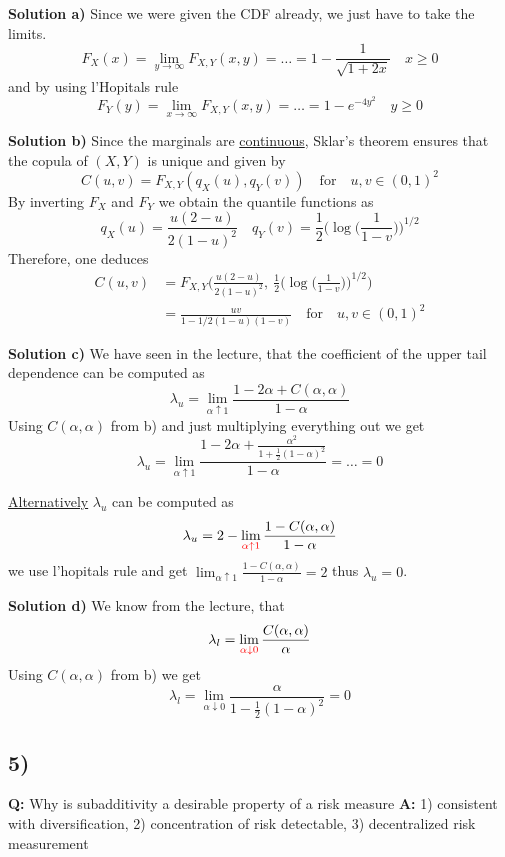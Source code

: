 \textbf{Solution a)} Since we were given the CDF already, we just have to take the limits.
\[
    F_X(x) = \lim_{y\to\infty} F_{X,Y}(x,y) = \dots = 1 - \frac{1}{\sqrt{1 + 2x}} \quad x \geq 0
\]
and by using l'Hopitals rule
\[
    F_{Y}(y) = \lim_{x\to \infty} F_{X,Y}(x,y) = \dots = 1 - e^{-4y^2} \quad y \geq 0
\]

\textbf{Solution b)} Since the marginals are \underline{continuous}, Sklar's theorem ensures that the copula of $(X,Y)$ is unique and given by
\[
    C(u,v) = F_{X,Y}(q_X(u), q_Y(v)) \quad \text{for} \quad u,v \in(0,1)^2
\]
By inverting $F_X$ and $F_Y$ we obtain the quantile functions as
\[
    q_X(u) = \frac{u(2-u)}{2(1-u)^2} \quad q_Y(v) = \frac{1}{2}\bigg(\log\bigg(\frac{1}{1-v}\bigg)\bigg)^{1/2}
\]
Therefore, one deduces
\begin{align*}
    C(u,v) &= F_{X,Y}\bigg(\frac{u(2-u)}{2(1-u)^2}, \ \frac{1}{2}\bigg(\log\bigg(\frac{1}{1-v}\bigg)\bigg)^{1/2}\bigg) \\
    &= \frac{uv}{1 - 1/2(1-u)(1-v)} \quad \text{for} \quad u,v\in(0,1)^2
\end{align*}

\textbf{Solution c)} We have seen in the lecture, that the coefficient of the upper tail dependence can be computed as
\[
    \lambda_u = \lim_{\alpha \uparrow 1} \frac{1 - 2\alpha + C(\alpha, \alpha)}{1-\alpha}
\]
Using $C(\alpha,\alpha)$ from b) and just multiplying everything out we get
\[
    \lambda_u = \lim_{\alpha\uparrow 1}\frac{1-2\alpha + \frac{\alpha^2}{1+\frac{1}{2}(1-\alpha)^2}}{1-\alpha} = \dots = 0
\]

\underline{Alternatively} $\lambda_u$ can be computed as
\[
    \lambda_u = 2 - \lim_{\textcolor{red}{\alpha\uparrow 1}}\frac{1 - C(\alpha, \alpha)}{1-\alpha}
\]
we use l'hopitals rule and get $\lim_{\alpha\uparrow 1}\frac{1 - C(\alpha, \alpha)}{1-\alpha} = 2$ thus $\lambda_u = 0$.

\textbf{Solution d)} We know from the lecture, that
\[
    \lambda_l =  \lim_{\textcolor{red}{\alpha \downarrow 0}}\frac{C(\alpha, \alpha)}{\alpha}
\]
Using $C(\alpha, \alpha)$ from b) we get 
\[
    \lambda_l = \lim_{\alpha\downarrow 0} \frac{\alpha}{1 - \frac{1}{2}(1 - \alpha)^2} = 0
\]

\subsection*{5)}
\textbf{Q:}
Why is subadditivity a desirable property of a risk measure
\textbf{A:}
1) consistent with diversification, 2) concentration of risk detectable, 3) decentralized risk measurement

